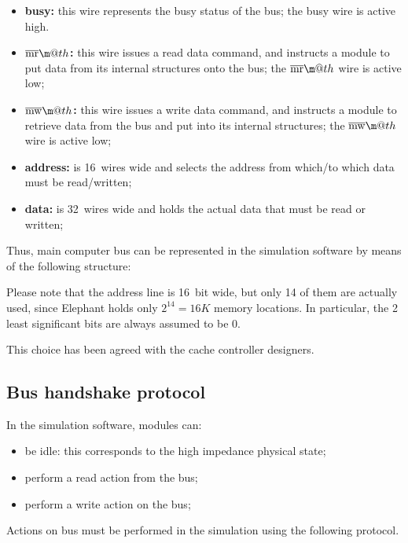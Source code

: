 \documentclass[a4paper,12pt]{article}
\makeatletter
\newcommand*{\textoverline}[1]{$\overline{\hbox{#1}}\m@th$}
\newcommand{\memoryname}{Elephant}
\makeatother
\begin{document}
\begin{itemize}
  \item \textbf{busy:} this wire represents the busy status of the bus; the busy wire is active high.
  \item \textbf{\textoverline{mr}:} this wire issues a read data command, and instructs a module to put data from its internal structures onto the bus; the \textoverline{mr} wire is active low;
  \item \textbf{\textoverline{mw}:} this wire issues a write data command, and instructs a module to retrieve data from the bus and put into its internal structures; the \textoverline{mw} wire is active low;
  \item \textbf{address:} is 16~wires wide and selects the address from which/to which data must be read/written;
  \item \textbf{data:} is 32~wires wide and holds the actual data that must be read or written;
\end{itemize}

Thus, main computer bus can be represented in the simulation software by means of the following structure:



Please note that the address line is 16~bit wide, but only 14 of them are actually used, since \memoryname{} holds only $2^{14} = 16K$ memory locations.
In particular, the 2 least significant bits are always assumed to be 0.

This choice has been agreed with the cache controller designers.

\subsection{Bus handshake protocol}
In the simulation software, modules can:
\begin{itemize}
  \item be idle: this corresponds to the high impedance physical state;
  \item perform a read action from the bus;
  \item perform a write action on the bus;
\end{itemize}

Actions on bus must be performed in the simulation using the following protocol.
\end{document}
